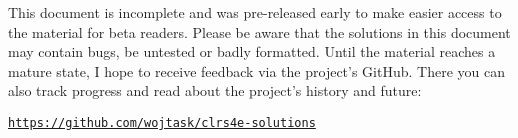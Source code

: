 \par{}
\vspace*{2ex}
\par\noindent This document is incomplete and was pre-released early to make easier access to the material for beta readers.
Please be aware that the solutions in this document may contain bugs, be untested or badly formatted.
Until the material reaches a mature state, I hope to receive feedback via the project's GitHub.
There you can also track progress and read about the project's history and future:
\begin{center}
    \href{https://github.com/wojtask/clrs4e-solutions}{\texttt{https://github.com/wojtask/clrs4e-solutions}}
\end{center}
